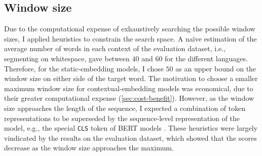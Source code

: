 \subsection{Window size} \label{sec:window-size}

Due to the computational expense of exhaustively searching the possible window sizes, I
applied heuristics to constrain the search space.
A naïve estimation of the average number of words in each context of the evaluation
dataset, i.e., segmenting on whitespace, gave between $40$ and $60$ for the different
languages.
Therefore, for the static-embedding models, I chose $50$ as an upper bound on the
window size on either side of the target word.
The motivation to choose a smaller maximum window size for contextual-embedding models
was economical, due to their greater computational expense (\cref{sec:cost-benefit}).
However, as the window size approaches the length of the sequence, I expected a
combination of token representations to be superseded by the sequence-level
representation of the model, e.g., the special \texttt{CLS} token of BERT models
\parencites[4174]{Devlin2019}.
These heuristics were largely vindicated by the results on the evaluation dataset,
which showed that the scores decrease as the window size approaches the maximum.
